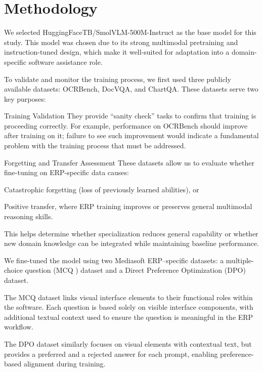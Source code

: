 \documentclass[10pt,conference,compsocconf]{IEEEtran}
\begin{document}
\section{Methodology}

We selected HuggingFaceTB/SmolVLM-500M-Instruct as the base model for this study. This model was chosen due to its strong multimodal pretraining and instruction-tuned design, which make it well-suited for adaptation into a domain-specific software assistance role.

To validate and monitor the training process, we first used three publicly available datasets: OCRBench\cite{Liu_2024}, DocVQA\cite{mathew2021docvqadatasetvqadocument}, and ChartQA\cite{masry2022chartqabenchmarkquestionanswering}. These datasets serve two key purposes:

Training Validation
They provide “sanity check” tasks to confirm that training is proceeding correctly. For example, performance on OCRBench should improve after training on it; failure to see such improvement would indicate a fundamental problem with the training process that must be addressed.

Forgetting and Transfer Assessment
These datasets allow us to evaluate whether fine-tuning on ERP-specific data causes:

Catastrophic forgetting (loss of previously learned abilities), or

Positive transfer, where ERP training improves or preserves general multimodal reasoning skills.

This helps determine whether specialization reduces general capability or whether new domain knowledge can be integrated while maintaining baseline performance.

We fine-tuned the model using two Mediasoft ERP–specific datasets: a multiple-choice question (MCQ \cite{li-etal-2024-multiple}  \cite{howard-ruder-2018-universal} \cite{allenai:arc} \cite{hendrycks2020measuring} \cite{hendryckstest2021}) dataset and a Direct Preference Optimization (DPO\cite{rafailov2024directpreferenceoptimizationlanguage}) dataset.

The MCQ dataset links visual interface elements to their functional roles within the software. Each question is based solely on visible interface components, with additional textual context used to ensure the question is meaningful in the ERP workflow.

The DPO dataset similarly focuses on visual elements with contextual text, but provides a preferred and a rejected answer for each prompt, enabling preference-based alignment during training.
\end{document}
